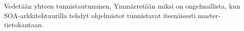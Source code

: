 Vedetään yhteen tunnistautuminen. Ymmärretään miksi on ongelmallista, kun SOA-arkkitehtuurilla tehdyt ohjelmistot tunnistavat itsenäisesti master-tietokantaan.